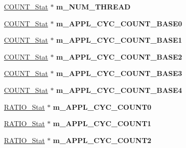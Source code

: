 \begin{DoxyCompactItemize}
\item 
\hypertarget{classall__stats__c_a702b9fe196f223e1492959d9afa2f24b}{
\hyperlink{classCOUNT__Stat}{COUNT\_\-Stat} $\ast$ {\bfseries m\_\-NUM\_\-THREAD}}
\label{classall__stats__c_a702b9fe196f223e1492959d9afa2f24b}

\item 
\hypertarget{classall__stats__c_aacc801a28588ebf332a615b3f5313883}{
\hyperlink{classCOUNT__Stat}{COUNT\_\-Stat} $\ast$ {\bfseries m\_\-APPL\_\-CYC\_\-COUNT\_\-BASE0}}
\label{classall__stats__c_aacc801a28588ebf332a615b3f5313883}

\item 
\hypertarget{classall__stats__c_a1a224873ef0ea8d6193ef4472bd9486d}{
\hyperlink{classCOUNT__Stat}{COUNT\_\-Stat} $\ast$ {\bfseries m\_\-APPL\_\-CYC\_\-COUNT\_\-BASE1}}
\label{classall__stats__c_a1a224873ef0ea8d6193ef4472bd9486d}

\item 
\hypertarget{classall__stats__c_a3af201402c203af77f36a1dd969733a2}{
\hyperlink{classCOUNT__Stat}{COUNT\_\-Stat} $\ast$ {\bfseries m\_\-APPL\_\-CYC\_\-COUNT\_\-BASE2}}
\label{classall__stats__c_a3af201402c203af77f36a1dd969733a2}

\item 
\hypertarget{classall__stats__c_a060299f2e3ae491a08fdaa935b2b0858}{
\hyperlink{classCOUNT__Stat}{COUNT\_\-Stat} $\ast$ {\bfseries m\_\-APPL\_\-CYC\_\-COUNT\_\-BASE3}}
\label{classall__stats__c_a060299f2e3ae491a08fdaa935b2b0858}

\item 
\hypertarget{classall__stats__c_a04d6ddda5577efc1b9ed7a66ff348da4}{
\hyperlink{classCOUNT__Stat}{COUNT\_\-Stat} $\ast$ {\bfseries m\_\-APPL\_\-CYC\_\-COUNT\_\-BASE4}}
\label{classall__stats__c_a04d6ddda5577efc1b9ed7a66ff348da4}

\item 
\hypertarget{classall__stats__c_ab30f783c61c3a4361beab28daaf89356}{
\hyperlink{classRATIO__Stat}{RATIO\_\-Stat} $\ast$ {\bfseries m\_\-APPL\_\-CYC\_\-COUNT0}}
\label{classall__stats__c_ab30f783c61c3a4361beab28daaf89356}

\item 
\hypertarget{classall__stats__c_a1ec9e839fcfd8b725c390380e0146f9a}{
\hyperlink{classRATIO__Stat}{RATIO\_\-Stat} $\ast$ {\bfseries m\_\-APPL\_\-CYC\_\-COUNT1}}
\label{classall__stats__c_a1ec9e839fcfd8b725c390380e0146f9a}

\item 
\hypertarget{classall__stats__c_a15de1f6decacfbeac892f00ff93f5e98}{
\hyperlink{classRATIO__Stat}{RATIO\_\-Stat} $\ast$ {\bfseries m\_\-APPL\_\-CYC\_\-COUNT2}}
\label{classall__stats__c_a15de1f6decacfbeac892f00ff93f5e98}


\end{DoxyCompactItemize}
